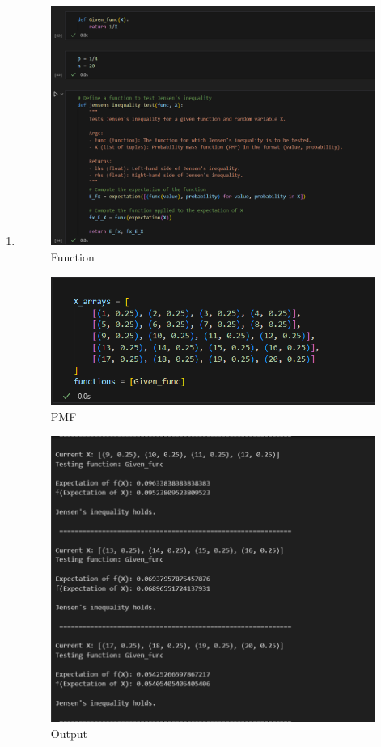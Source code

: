 \documentclass{article}
\begin{document}
\begin{enumerate}
\newpage
\item
    \begin{figure}
        \includegraphics{1-1.png}
        \caption{Function}
    \end{figure}
    \begin{figure}
        \includegraphics{1.png}
        \caption{PMF}
    \end{figure}
    \begin{figure}
        \includegraphics{3.png}
        \caption{Output}
    \end{figure}
\end{enumerate}
\end{document}
